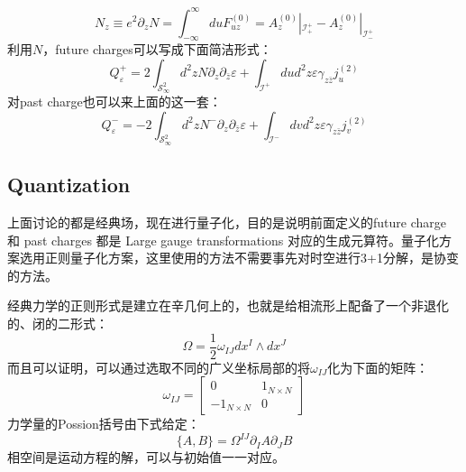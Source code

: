 \begin{equation}
	N_z\equiv e^2\partial_zN=\int_{-\infty}^{\infty}duF_{uz}^{(0)}=A_{z}^{(0)}|_{\mathcal{I}_{+}^{+}}-A_{z}^{(0)}|_{\mathcal{I}_{-}^{+}}
\end{equation}
利用$N$，future charges可以写成下面简洁形式：
\begin{equation}\label{eq:23.21}
	Q_{\varepsilon}^{+}=2\int_{\mathcal{S}_\infty^2} d^{2}zN\partial_{z}\partial_{\bar{z}}\varepsilon+\int_{\mathcal I^{+}}dud^{2}z\varepsilon\gamma_{z\bar{z}}j_{u}^{(2)}
\end{equation}
对past charge也可以来上面的这一套：
\begin{equation}\label{eq:23.21.2}
	Q_{\varepsilon}^{-}=-2\int_{\mathcal{S}_\infty^2} d^{2}zN^-\partial_{z}\partial_{\bar{z}}\varepsilon+\int_{\mathcal I^{-}}dvd^{2}z\varepsilon\gamma_{z\bar{z}}j_{v}^{(2)}
\end{equation}
\subsection{Quantization}
上面讨论的都是经典场，现在进行量子化，目的是说明前面定义的future charge 和 past charges 都是 Large gauge transformations 对应的生成元算符。量子化方案选用正则量子化方案，这里使用的方法不需要事先对时空进行3+1分解，是协变的方法\cite{Ashtekar1987AsymptoticQ,Frolov:1979ab,1989thyg.book.....H,Lee:1990nz,Wald:1999wa}。

经典力学的正则形式是建立在辛几何上的，也就是给相流形上配备了一个非退化的、闭的二形式\cite{Arnold}：
\begin{equation}\label{eq:23.22}
	\Omega=\frac{1}{2}\omega_{IJ}dx^I\wedge dx^J
\end{equation}
而且可以证明，可以通过选取不同的广义坐标局部的将$\omega_{IJ}$化为下面的矩阵：
\begin{equation}
	\omega_{IJ}=\left.\left[\begin{matrix}0&1_{N\times N}\\-1_{N\times N}&0\end{matrix}\right.\right]
\end{equation}
力学量的Possion括号由下式给定：
\begin{equation}
	\{A,B\}=\Omega^{IJ}\partial_IA\partial_JB
\end{equation}
相空间是运动方程的解，可以与初始值一一对应。

